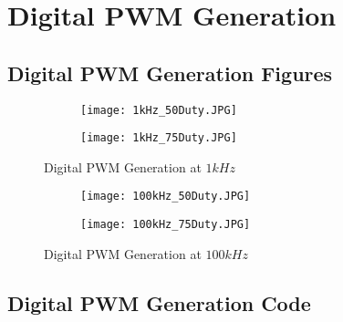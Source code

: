 \chapter{Digital PWM Generation} \label{A:digital_PWM}

\section{Digital PWM Generation Figures}

\begin{figure}[H]
    \centering
    \begin{subfigure}{0.45\textwidth}
        \texttt{[image: 1kHz\_50Duty.JPG]}

    \end{subfigure}
    \begin{subfigure}{0.45\textwidth}
        \texttt{[image: 1kHz\_75Duty.JPG]}

    \end{subfigure}
    \caption{Digital PWM Generation at $1kHz$}

\end{figure}

\begin{figure}[H]
    \centering
    \begin{subfigure}{0.45\textwidth}
        \texttt{[image: 100kHz\_50Duty.JPG]}

    \end{subfigure}
    \begin{subfigure}{0.45\textwidth}
        \texttt{[image: 100kHz\_75Duty.JPG]}

    \end{subfigure}
    \caption{Digital PWM Generation at $100kHz$}

\end{figure}

\newpage
\section{Digital PWM Generation Code}


